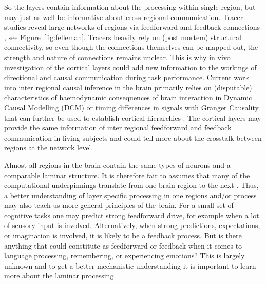 So the layers contain information about the processing within single region, but may just as well be informative about cross-regional communication. Tracer studies reveal large networks of regions via feedforward and feedback connections \cite{Felleman1991}, see Figure~\ref{fig:felleman}. Tracers heavily rely on (post mortem) structural connectivity, so even though the connections themselves can be mapped out, the strength and nature of connections remains unclear. This is why in vivo investigation of the cortical layers could add new information to the workings of directional and causal communication during task performance. Current work into inter regional causal inference in the brain primarily relies on (disputable) characteristics of haemodynamic consequences of brain interaction in Dynamic Causal Modelling (DCM) \cite{Friston2009} or timing differences in signals with Granger Causality \cite{Aalen2007} that can further be used to establish cortical hierarchies \cite{Michalareas2016}. The cortical layers may provide the same information of inter regional feedforward and feedback communication in living subjects and could tell more about the crosstalk between regions at the network level. 


Almost all regions in the brain contain the same types of neurons and a comparable laminar structure. It is therefore fair to assumes that many of the computational underpinnings translate from one brain region to the next \cite{Buonomano1998}. Thus, a better understanding of layer specific processing in one regions and/or process may also teach us more general principles of the brain. For a small set of cognitive tasks one may predict strong feedforward drive, for example when a lot of sensory input is involved. Alternatively, when strong predictions, expectations, or imagination is involved, it is likely to be a feedback process. But is there anything that could constitute as feedforward or feedback when it comes to language processing, remembering, or experiencing emotions? This is largely unknown and to get a better mechanistic understanding it is important to learn more about the laminar processing. 

